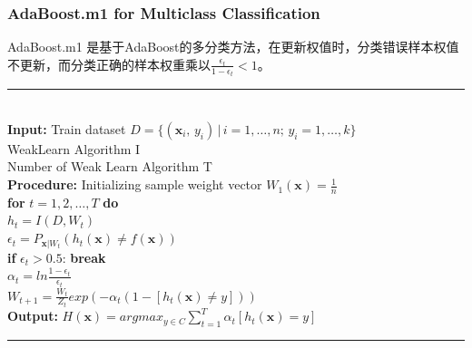 \documentclass[usenames,dvipsnames]{beamer}
\begin{document}
\begin{frame}
\frametitle{AdaBoost.m1 for Multiclass Classification}
AdaBoost.m1 是基于AdaBoost的多分类方法，在更新权值时，分类错误样本权值不更新，而分类正确的样本权重乘以$\frac{\epsilon_t}{1-\epsilon_t}<1$。\par
\noindent\rule[0.1\baselineskip]{\textwidth}{0.75pt}\\
\textbf{Input:} Train dataset $D = \{(\textbf{x}_i,\,y_i)\,|\,i = 1,\dots, n;\, y_i = 1,\dots, k\}$\\
\hspace*{32pt} WeakLearn Algorithm I\\
\hspace*{32pt} Number of Weak Learn Algorithm T\\
\textbf{Procedure:} 
    \hspace*{2pt}Initializing sample weight vector $W_1(\textbf{x}) = \frac{1}{n}$\\
    \hspace*{58pt} \textbf{for} $t = 1, 2,\dots, T$ \textbf{do}\\
        \hspace*{76pt} $h_t = I(D, W_t)$\\
        \hspace*{76pt} $\epsilon_t = P_{\textbf{x}|W_t}(h_t(\textbf{x}) \neq f(\textbf{x}))$\\
        \hspace*{76pt} \textbf{if} $\epsilon_t > 0.5$: \textbf{break}\\
        \hspace*{76pt} $\alpha_t = ln\frac{1-\epsilon_t}{\epsilon_t}$\\
        \hspace*{76pt} $W_{t+1} = \frac{W_t}{Z_t}exp(-\alpha_t(1-[h_t(\textbf{x})\neq y]))$\\
\textbf{Output:} $H(\textbf{x}) = argmax_{y\in C}\sum_{t=1}^{T}\alpha_t[h_t(\textbf{x})=y]$\\
\noindent\rule[0.1\baselineskip]{\textwidth}{0.75pt}\par
\end{frame}
\end{document}
